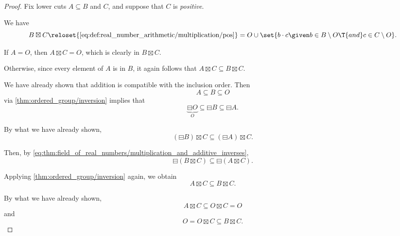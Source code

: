 \begin{proof}
  Fix lower cuts \( A \subseteq B \) and \( C \), and suppose that \( C \) is \emph{positive}.

   We have
  \begin{equation*}
    B \boxtimes C
    \reloset {\eqref{eq:def:real_number_arithmetic/multiplication/pos}} =
    O \cup \set{ b \cdot c \given b \in B \setminus O \T{and} c \in C \setminus O }.
  \end{equation*}

  If \( A = O \), then \( A \boxtimes C = O \), which is clearly in \( B \boxtimes C \).

  Otherwise, since every element of \( A \) is in \( B \), it again follows that \( A \boxtimes C \subseteq B \boxtimes C \).

   We have already shown that addition is compatible with the inclusion order. Then
  \begin{equation*}
    A \subseteq B \subseteq O
  \end{equation*}
  via \cref{thm:ordered_group/inversion} implies that
  \begin{equation*}
    \underbrace{\boxminus O}_O \subseteq \boxminus B \subseteq \boxminus A.
  \end{equation*}

  By what we have already shown,
  \begin{equation*}
    (\boxminus B) \boxtimes C \subseteq (\boxminus A) \boxtimes C.
  \end{equation*}

  Then, by \eqref{eq:thm:field_of_real_numbers/multiplication_and_additive_inverses},
  \begin{equation*}
    \boxminus (B \boxtimes C) \subseteq \boxminus (A \boxtimes C).
  \end{equation*}

  Applying \cref{thm:ordered_group/inversion} again, we obtain
  \begin{equation*}
    A \boxtimes C \subseteq B \boxtimes C.
  \end{equation*}

   By what we have already shown,
  \begin{equation*}
    A \boxtimes C \subseteq O \boxtimes C = O
  \end{equation*}
  and
  \begin{equation*}
    O = O \boxtimes C \subseteq B \boxtimes C.
  \end{equation*}


\end{proof}
